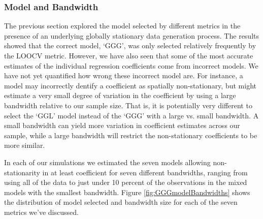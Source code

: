 \documentclass{article}\usepackage[]{graphicx}\usepackage[]{color}
\begin{document}
\subsubsection{Model and Bandwidth}

The previous section explored the model selected by different metrics in the presence of an underlying globally stationary data generation process. The results showed that the correct model, `GGG', was only selected relatively frequently by the LOOCV metric. However, we have also seen that some of the most accurate estimates of the individual regression coefficients come from incorrect models. We have not yet quantified how wrong these incorrect model are. For instance, a model may incorrectly dentify a coefficient as spatially non-stationary, but might estimate a very small degree of variation in the coefficient by using a large bandwidth relative to our sample size. That is, it is potentially very different to select the `GGL' model instead of the `GGG' with a large vs. small bandwidth. A small bandwidth can yield more variation in coefficient estimates across our sample, while a large bandwidth will restrict the non-stationary coefficients to be more similar.

In each of our simulations we estimated the seven models allowing non-stationarity in at least coefficient for seven different bandwidths, ranging from using all of the data to just under 10 percent of the observations in the mixed models with the smallest bandwidth. Figure \ref{fig:GGGmodelBandwidths} shows the distribution of model selected and bandwidth size for each of the seven metrics we've discussed.
\end{document}

